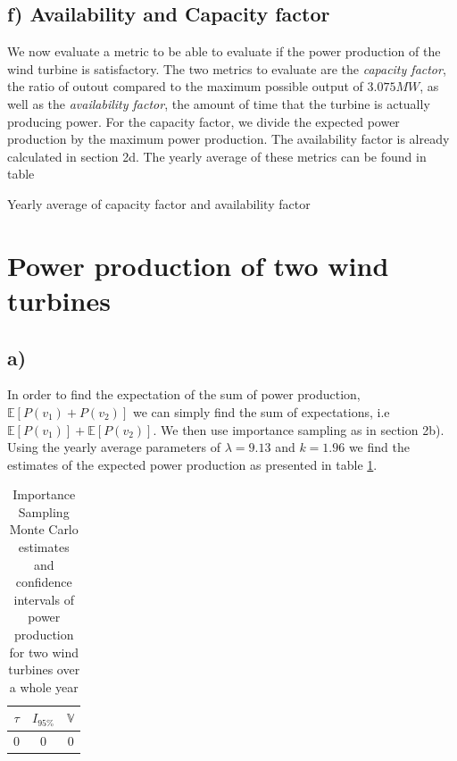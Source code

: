\documentclass[a4paper]{article}
\begin{document}
\subsection*{f) Availability and Capacity factor}
We now evaluate a metric to be able to evaluate if the power production of the wind turbine is satisfactory. The two metrics to evaluate are the \textit{capacity factor}, the ratio of outout compared to the maximum possible output of $3.075MW$, as well as the \textit{availability factor}, the amount of time that the turbine is actually producing power. For the capacity factor, we divide the expected power production by the maximum power production. The availability factor is already calculated in section 2d. The yearly average of these metrics can be found in table %

\begin{table}[H]
    \centering
    \caption{Yearly average of capacity factor and availability factor}
    \label{metrics}
\end{table}

\newpage
\section{Power production of two wind turbines}
\label{sec:twoTurbines}

\subsection*{a)}
In order to find the expectation of the sum of power production, $\mathbb{E}[P(v_1) + P(v_2)]$ we can simply find the sum of expectations, i.e $\mathbb{E}[P(v_1)] + \mathbb{E}[P(v_2)]$. We then use importance sampling as in section 2b). Using the yearly average parameters of $\lambda = 9.13$ and $k = 1.96$ we find the estimates of the expected power production as presented in table \ref{tab:IS2results}.


\begin{table}[H]
    \centering
    \caption{Importance Sampling Monte Carlo estimates and confidence intervals of power production for two wind turbines over a whole year}
    \label{tab:IS2results}
    \begin{tabular}{| c c c ||}
        \hline
        $\tau$ & $I_{95\%}$ & $\mathbb{V}$ \\
        \hline\hline
        0 & 0 & 0 \\
        \hline
    \end{tabular}
\end{table}
\end{document}
